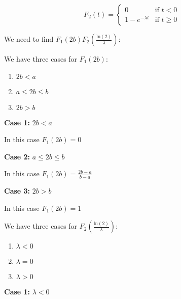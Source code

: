 \singlespacing

\begin{equation}
    F_2(t) = \begin{cases}
        0                  & \text{if } t < 0    \\
        1 - e^{-\lambda t} & \text{if } t \geq 0
    \end{cases}
\end{equation}

\singlespacing

We need to find $F_1(2b)F_2(\frac{\text{ln}(2)}{\lambda})$:

\singlespacing
\singlespacing

We have three cases for $F_1(2b)$:

\singlespacing

\begin{enumerate}
    \item $2b < a$
    \item $a \leq 2b \leq b$
    \item $2b > b$
\end{enumerate}

\singlespacing

\textbf{Case 1:} $2b < a$

\singlespacing

In this case $F_1(2b) = 0$

\singlespacing

\textbf{Case 2:} $a \leq 2b \leq b$

\singlespacing

In this case $F_1(2b) = \frac{2b - a}{b-a}$

\singlespacing

\textbf{Case 3:} $2b > b$

\singlespacing

In this case $F_1(2b) = 1$

\singlespacing
\singlespacing

We have three cases for $F_2(\frac{\text{ln}(2)}{\lambda})$:

\singlespacing

\begin{enumerate}
    \item $\lambda < 0$
    \item $\lambda = 0$
    \item $\lambda > 0$
\end{enumerate}

\singlespacing

\textbf{Case 1:} $\lambda < 0$

